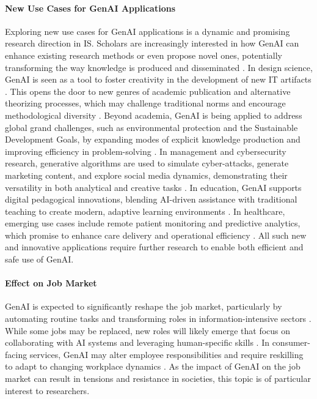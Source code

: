\paragraph{New Use Cases for GenAI Applications}
Exploring new use cases for GenAI applications is a dynamic and promising research direction in IS. Scholars are increasingly interested in how GenAI can enhance existing research methods or even propose novel ones, potentially transforming the way knowledge is produced and disseminated \parencite{R02, R06}. In design science, GenAI is seen as a tool to foster creativity in the development of new IT artifacts \parencite{R04}. This opens the door to new genres of academic publication and alternative theorizing processes, which may challenge traditional norms and encourage methodological diversity \parencite{R06}.
Beyond academia, GenAI is being applied to address global grand challenges, such as environmental protection and the Sustainable Development Goals, by expanding modes of explicit knowledge production and improving efficiency in problem-solving \parencite{R07}. In management and cybersecurity research, generative algorithms are used to simulate cyber-attacks, generate marketing content, and explore social media dynamics, demonstrating their versatility in both analytical and creative tasks \parencite{S04}. In education, GenAI supports digital pedagogical innovations, blending AI-driven assistance with traditional teaching to create modern, adaptive learning environments \parencite{S12}. In healthcare, emerging use cases include remote patient monitoring and predictive analytics, which promise to enhance care delivery and operational efficiency \parencite{S16}. All such new and innovative applications require further research to enable both efficient and safe use of GenAI.

\paragraph{Effect on Job Market}
GenAI is expected to significantly reshape the job market, particularly by automating routine tasks and transforming roles in information-intensive sectors \parencite{R04, R07}. While some jobs may be replaced, new roles will likely emerge that focus on collaborating with AI systems and leveraging human-specific skills \parencite{R07}. In consumer-facing services, GenAI may alter employee responsibilities and require reskilling to adapt to changing workplace dynamics \parencite{R08}. As the impact of GenAI on the job market can result in tensions and resistance in societies, this topic is of particular interest to researchers.

